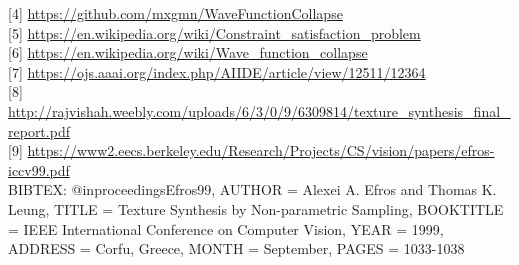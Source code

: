 \documentclass[12pt]{report}
\begin{document}
{[4]} \url{https://github.com/mxgmn/WaveFunctionCollapse}\\
{[5]} \url{https://en.wikipedia.org/wiki/Constraint_satisfaction_problem}\\
{[6]} \url{https://en.wikipedia.org/wiki/Wave_function_collapse}\\
{[7]} \url{https://ojs.aaai.org/index.php/AIIDE/article/view/12511/12364}\\
{[8]} \url{http://rajvishah.weebly.com/uploads/6/3/0/9/6309814/texture_synthesis_final_report.pdf}\\
{[9]} \url{https://www2.eecs.berkeley.edu/Research/Projects/CS/vision/papers/efros-iccv99.pdf}\\

BIBTEX:
@inproceedings{Efros99,
    AUTHOR  = {Alexei A. Efros and Thomas K. Leung},
    TITLE   = {Texture Synthesis by Non-parametric Sampling},
    BOOKTITLE = {IEEE International Conference on Computer Vision},
    YEAR    = {1999},
    ADDRESS = {Corfu, Greece},
    MONTH   = {September},
    PAGES   = {1033-1038}
}
\end{document}
